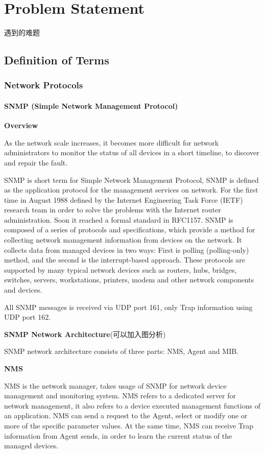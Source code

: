 \newpage
\chapter{Problem Statement}

遇到的难题

\section{Definition of Terms}

\subsection{Network Protocols}

\subsubsection{SNMP (Simple Network Management Protocol)}

\textbf{Overview}

As the network scale increases, it becomes more difficult for network administrators to monitor the status of all devices in a short timeline, to discover and repair the fault.  

SNMP is short term for Simple Network Management Protocol, SNMP is defined as the application protocol for the management services on network. For the first time in August 1988 defined by the Internet Engineering Task Force (IETF) research team in order to solve the problems with the Internet router administration. Soon it reached a formal standard in RFC1157. SNMP is composed of a series of protocols and specifications, which provide a method for collecting network management information from devices on the network. It collects data from managed devices in two ways: First is polling (polling-only) method, and the second is the interrupt-based approach. These protocols are supported by many typical network devices such as routers, hubs, bridges, switches, servers, workstations, printers, modem and other network components and devices.  

All SNMP messages is received via UDP port 161, only Trap information using UDP port 162.


\textbf{SNMP Network Architecture}(可以加入图分析)

SNMP network architecture consists of three parts: NMS, Agent and MIB.

\textbf{NMS}

NMS is the network manager, takes usage of SNMP for network device management and monitoring system. NMS refers to a dedicated server for network management, it also refers to a device executed management functions of an application.  
NMS can send a request to the Agent, select or modify one or more of the specific parameter values. At the same time, NMS can receive Trap information from Agent sends, in order to learn the current status of the managed devices.  

